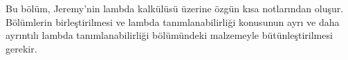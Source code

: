 


\begin{editorial}
Bu bölüm, Jeremy'nin lambda kalkülüsü üzerine özgün kısa notlarından oluşur.
Bölümlerin birleştirilmesi ve lambda tanımlanabilirliği konusunun ayrı ve
daha ayrıntılı lambda tanımlanabilirliği bölümündeki malzemeyle
bütünleştirilmesi gerekir.
\end{editorial}














\OLEndChapterHook

